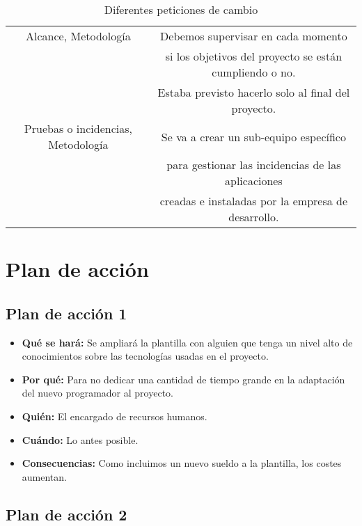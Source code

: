 \begin{table}[H]
\begin{center}
\begin{tabular}{|c|c|}
			Alcance, Metodología & Debemos supervisar en cada momento \\
			& si los objetivos del proyecto se están cumpliendo o no. \\
			& Estaba previsto hacerlo solo al final del proyecto. \\
			Pruebas o incidencias, Metodología & Se va a crear un sub-equipo específico  \\ 
			& para gestionar las incidencias de las aplicaciones \\
			& creadas e instaladas por la empresa de desarrollo. \\ \bottomrule
		\end{tabular}
	\end{center}
	\caption{Diferentes peticiones de cambio}
	\label{peticionesCambio}
\end{table}

\section{Plan de acción}

\subsection{Plan de acción 1}

\begin{itemize}
	\item \textbf{Qué se hará: } Se ampliará la plantilla con alguien que tenga un nivel alto de conocimientos sobre las tecnologías usadas en el proyecto. 
	\item \textbf{Por qué: } Para no dedicar una cantidad de tiempo grande en la adaptación del nuevo programador al proyecto.
	\item \textbf{Quién: } El encargado de recursos humanos.
	\item \textbf{Cuándo: } Lo antes posible.
	\item \textbf{Consecuencias: } Como incluimos un nuevo sueldo a la plantilla, los costes aumentan.
\end{itemize}

\subsection{Plan de acción 2}

